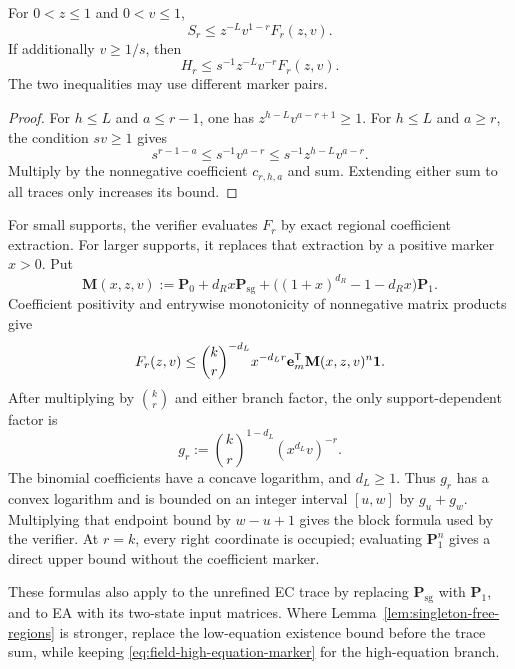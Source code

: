 \begin{lemma}
\label{lem:field-trace-markers}
For $0<z\leq1$ and $0<v\leq1$,
\begin{equation}
 S_r\leq z^{-L}v^{1-r}F_r(z,v).
 \label{eq:field-structural-marker}
\end{equation}
If additionally $v\geq1/s$, then
\begin{equation}
 H_r\leq s^{-1}z^{-L}v^{-r}F_r(z,v).
 \label{eq:field-high-equation-marker}
\end{equation}
The two inequalities may use different marker pairs.
\end{lemma}

\begin{proof}
For $h\leq L$ and $a\leq r-1$, one has
$z^{h-L}v^{a-r+1}\geq1$.  For $h\leq L$ and $a\geq r$, the condition
$sv\geq1$ gives
\[
 s^{r-1-a}\leq s^{-1}v^{a-r}
 \leq s^{-1}z^{h-L}v^{a-r}.
\]
Multiply by the nonnegative coefficient $c_{r,h,a}$ and sum.
Extending either sum to all traces only increases its bound.
\end{proof}

For small supports, the verifier evaluates $F_r$ by exact regional
coefficient extraction.  For larger supports, it replaces that extraction
by a positive marker $x>0$.  Put
\[
 \mathbf M(x,z,v):=\mathbf P_0+d_Rx\mathbf P_{\mathrm{sg}}
       +\bigl((1+x)^{d_R}-1-d_Rx\bigr)\mathbf P_1.
\]
Coefficient positivity and entrywise monotonicity of nonnegative matrix
products give
\begin{equation}
 F_r(z,v)\leq\binom{k}{r}^{-d_L}x^{-d_Lr}
 \mathbf e_m^{\mathsf T}\mathbf M(x,z,v)^n\mathbf 1.
 \label{eq:field-regional-marker}
\end{equation}
After multiplying by $\binom{k}{r}$ and either branch factor, the only
support-dependent factor is
\[
 g_r:=\binom{k}{r}^{1-d_L}(x^{d_L}v)^{-r}.
\]
The binomial coefficients have a concave logarithm, and $d_L\geq1$.
Thus $g_r$ has a convex logarithm and is bounded on an integer interval
$[u,w]$ by $g_u+g_w$.  Multiplying that endpoint bound by $w-u+1$ gives
the block formula used by the verifier.
At $r=k$, every right coordinate is occupied; evaluating
$\mathbf P_1^n$ gives a direct upper bound without the coefficient marker.

These formulas also apply to the unrefined EC trace by replacing
$\mathbf P_{\mathrm{sg}}$ with $\mathbf P_1$, and to EA with its two-state
input matrices.  Where Lemma~\ref{lem:singleton-free-regions} is stronger,
replace the low-equation existence bound before the trace sum, while keeping
\eqref{eq:field-high-equation-marker} for the high-equation branch.
